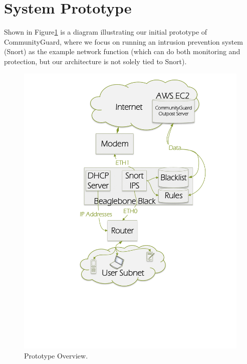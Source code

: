 \section{System Prototype}
\label{sec:design}

Shown in Figure\ref{fig:proto} is a diagram illustrating our initial prototype of CommunityGuard, where we focus on running an intrusion prevention system (Snort) as the example network function (which can do both monitoring and protection, but our architecture is not solely tied to Snort).  



\begin{figure}
    \centering
    \includegraphics[width=0.75\columnwidth]{figs/microarch.pdf}
    \caption{Prototype Overview.}
    \label{fig:proto}
\end{figure}

